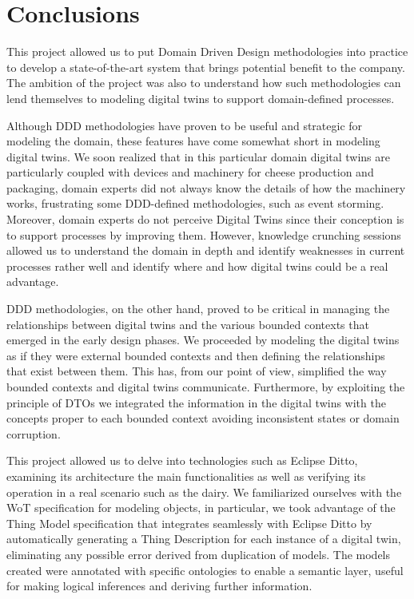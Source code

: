\chapter{Conclusions}
This project allowed us to put Domain Driven Design methodologies into practice to develop a state-of-the-art system that brings potential benefit to the company. The ambition of the project was also to understand how such methodologies can lend themselves to modeling digital twins to support domain-defined processes.

Although DDD methodologies have proven to be useful and strategic for modeling the domain, these features have come somewhat short in modeling digital twins. We soon realized that in this particular domain digital twins are particularly coupled with devices and machinery for cheese production and packaging, domain experts did not always know the details of how the machinery works, frustrating some DDD-defined methodologies, such as event storming. Moreover, domain experts do not perceive Digital Twins since their conception is to support processes by improving them. However, knowledge crunching sessions allowed us to understand the domain in depth and identify weaknesses in current processes rather well and identify where and how digital twins could be a real advantage.

DDD methodologies, on the other hand, proved to be critical in managing the relationships between digital twins and the various bounded contexts that emerged in the early design phases. We proceeded by modeling the digital twins as if they were external bounded contexts and then defining the relationships that exist between them. This has, from our point of view, simplified the way bounded contexts and digital twins communicate. Furthermore, by exploiting the principle of DTOs we integrated the information in the digital twins with the concepts proper to each bounded context avoiding inconsistent states or domain corruption.

This project allowed us to delve into technologies such as Eclipse Ditto, examining its architecture the main functionalities as well as verifying its operation in a real scenario such as the dairy.
We familiarized ourselves with the WoT specification for modeling objects, in particular, we took advantage of the Thing Model specification that integrates seamlessly with Eclipse Ditto by automatically generating a Thing Description for each instance of a digital twin, eliminating any possible error derived from duplication of models.
The models created were annotated with specific ontologies to enable a semantic layer, useful for making logical inferences and deriving further information.

